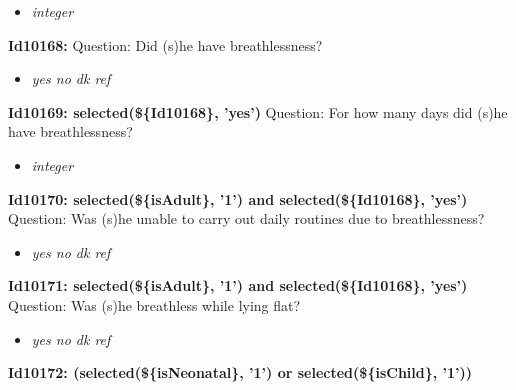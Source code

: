\documentclass{article}%
\begin{document}
%
\begin{itemize}%
\item%
\textit{integer\newline%
}%
\end{itemize}%
\textbf{Id10168: \newline%
}%
Question: Did (s)he have breathlessness?\newline%
%
\begin{itemize}%
\item%
\textit{yes\newline%
 no\newline%
 dk\newline%
 ref\newline%
}%
\end{itemize}%
\textbf{Id10169: selected(\$\{Id10168\}, 'yes')\newline%
}%
Question: For how many days did (s)he have breathlessness?\newline%
%
\begin{itemize}%
\item%
\textit{integer\newline%
}%
\end{itemize}%
\textbf{Id10170: selected(\$\{isAdult\}, '1') and selected(\$\{Id10168\}, 'yes')\newline%
}%
Question: Was (s)he unable to carry out daily routines due to breathlessness?\newline%
%
\begin{itemize}%
\item%
\textit{yes\newline%
 no\newline%
 dk\newline%
 ref\newline%
}%
\end{itemize}%
\textbf{Id10171: selected(\$\{isAdult\}, '1') and selected(\$\{Id10168\}, 'yes')\newline%
}%
Question: Was (s)he breathless while lying flat?\newline%
%
\begin{itemize}%
\item%
\textit{yes\newline%
 no\newline%
 dk\newline%
 ref\newline%
}%
\end{itemize}%
\textbf{Id10172: (selected(\$\{isNeonatal\}, '1') or selected(\$\{isChild\}, '1'))\newline%
}%
\end{document}
